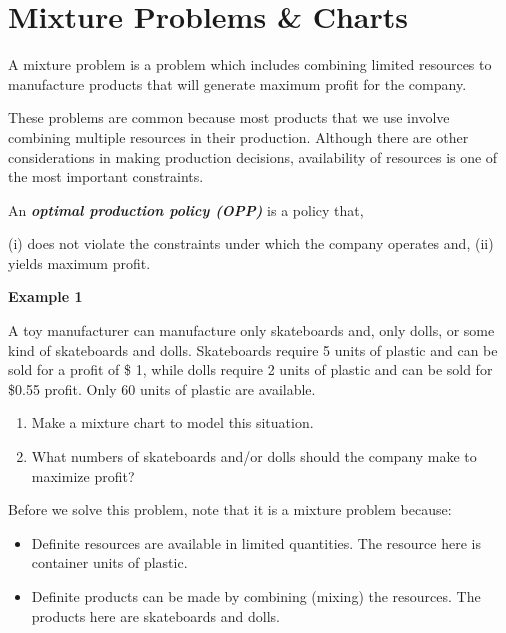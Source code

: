 \documentclass[
  letterpaper,
  DIV=11,
  numbers=noendperiod]{scrreprt}
\newenvironment{Shaded}{\begin{snugshade}}{\end{snugshade}}
\newcommand{\DataTypeTok}[1]{\textcolor[rgb]{0.68,0.00,0.00}{#1}}
\newcommand{\ErrorTok}[1]{\textcolor[rgb]{0.68,0.00,0.00}{#1}}
\newcommand{\KeywordTok}[1]{\textcolor[rgb]{0.00,0.23,0.31}{#1}}
\providecommand{\tightlist}{%
  \setlength{\itemsep}{0pt}\setlength{\parskip}{0pt}}\usepackage{longtable,booktabs,array}
\begin{document}
\hypertarget{mixture-problems-charts}{%
\section{Mixture Problems \& Charts}\label{mixture-problems-charts}}

A mixture problem is a problem which includes combining limited
resources to manufacture products that will generate maximum profit for
the company.

These problems are common because most products that we use involve
combining multiple resources in their production. Although there are
other considerations in making production decisions, availability of
resources is one of the most important constraints.

An \textbf{\emph{optimal production policy (OPP)}} is a policy that,

\begin{Shaded}
\begin{Highlighting}[]
\ErrorTok{(}\DataTypeTok{i}\ErrorTok{)} \DataTypeTok{does} \DataTypeTok{not} \DataTypeTok{violate} \DataTypeTok{the} \DataTypeTok{constraints} \DataTypeTok{under} \DataTypeTok{which} \DataTypeTok{the} \DataTypeTok{company} \DataTypeTok{operates} \DataTypeTok{and}\ErrorTok{,}
\ErrorTok{(}\DataTypeTok{ii}\ErrorTok{)} \DataTypeTok{yields} \DataTypeTok{maximum} \DataTypeTok{profit}\KeywordTok{.}
\end{Highlighting}
\end{Shaded}

\textbf{Example 1}

A toy manufacturer can manufacture only skateboards and, only dolls, or
some kind of skateboards and dolls. Skateboards require 5 units of
plastic and can be sold for a profit of \$ 1, while dolls require 2
units of plastic and can be sold for \$0.55 profit. Only 60 units of
plastic are available.

\begin{enumerate}
\def\labelenumi{(\alph{enumi})}
\tightlist
\item
  Make a mixture chart to model this situation.
\item
  What numbers of skateboards and/or dolls should the company make to
  maximize profit?
\end{enumerate}

Before we solve this problem, note that it is a mixture problem because:

\begin{itemize}
\item
  Definite resources are available in limited quantities. The resource
  here is container units of plastic.
\item
  Definite products can be made by combining (mixing) the resources. The
  products here are skateboards and dolls.
\end{itemize}
\end{document}
